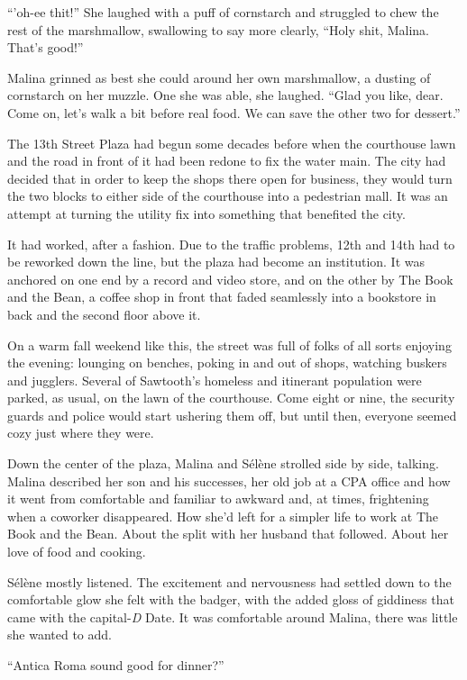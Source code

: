 ``'oh-ee thit!'' She laughed with a puff of cornstarch and struggled to chew the rest of the marshmallow, swallowing to say more clearly, ``Holy shit, Malina. That's good!''

Malina grinned as best she could around her own marshmallow, a dusting of cornstarch on her muzzle. One she was able, she laughed. ``Glad you like, dear. Come on, let's walk a bit before real food. We can save the other two for dessert.''

The 13th Street Plaza had begun some decades before when the courthouse lawn and the road in front of it had been redone to fix the water main. The city had decided that in order to keep the shops there open for business, they would turn the two blocks to either side of the courthouse into a pedestrian mall. It was an attempt at turning the utility fix into something that benefited the city.

It had worked, after a fashion. Due to the traffic problems, 12th and 14th had to be reworked down the line, but the plaza had become an institution. It was anchored on one end by a record and video store, and on the other by The Book and the Bean, a coffee shop in front that faded seamlessly into a bookstore in back and the second floor above it.

On a warm fall weekend like this, the street was full of folks of all sorts enjoying the evening: lounging on benches, poking in and out of shops, watching buskers and jugglers. Several of Sawtooth's homeless and itinerant population were parked, as usual, on the lawn of the courthouse. Come eight or nine, the security guards and police would start ushering them off, but until then, everyone seemed cozy just where they were.

Down the center of the plaza, Malina and Sélène strolled side by side, talking. Malina described her son and his successes, her old job at a CPA office and how it went from comfortable and familiar to awkward and, at times, frightening when a coworker disappeared. How she'd left for a simpler life to work at The Book and the Bean. About the split with her husband that followed. About her love of food and cooking.

Sélène mostly listened. The excitement and nervousness had settled down to the comfortable glow she felt with the badger, with the added gloss of giddiness that came with the capital-\emph{D} Date. It was comfortable around Malina, there was little she wanted to add.

``Antica Roma sound good for dinner?''

